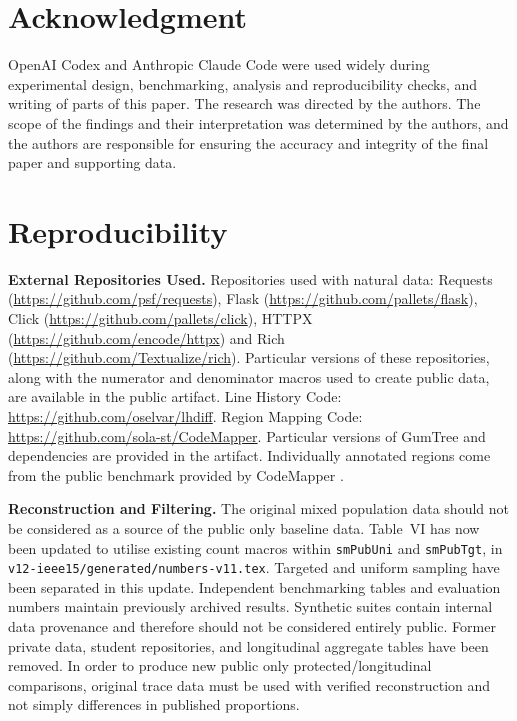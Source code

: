 \documentclass[10pt,conference,letterpaper]{IEEEtran}
\begin{document}
\section*{Acknowledgment}
OpenAI Codex and Anthropic Claude Code were used widely during experimental design, benchmarking, analysis and reproducibility checks, and writing of parts of this paper. The research was directed by the authors. The scope of the findings and their interpretation was determined by the authors, and the authors are responsible for ensuring the accuracy and integrity of the final paper and supporting data.

\section*{Reproducibility}
\textbf{External Repositories Used.} Repositories used with natural data: Requests (\url{https://github.com/psf/requests}), Flask (\url{https://github.com/pallets/flask}), Click (\url{https://github.com/pallets/click}), HTTPX (\url{https://github.com/encode/httpx}) and Rich (\url{https://github.com/Textualize/rich}). Particular versions of these repositories, along with the numerator and denominator macros used to create public data, are available in the public artifact. Line History Code: \url{https://github.com/oselvar/lhdiff}. Region Mapping Code: \url{https://github.com/sola-st/CodeMapper}. Particular versions of GumTree and dependencies are provided in the artifact. Individually annotated regions come from the public benchmark provided by CodeMapper \cite{codemapper2026}.

\textbf{Reconstruction and Filtering.} The original mixed population data should not be considered as a source of the public only baseline data. Table~VI has now been updated to utilise existing count macros within \texttt{smPubUni} and \texttt{smPubTgt}, in \texttt{v12-ieee15/generated/numbers-v11.tex}. Targeted and uniform sampling have been separated in this update. Independent benchmarking tables and evaluation numbers maintain previously archived results. Synthetic suites contain internal data provenance and therefore should not be considered entirely public. Former private data, student repositories, and longitudinal aggregate tables have been removed. In order to produce new public only protected/longitudinal comparisons, original trace data must be used with verified reconstruction and not simply differences in published proportions.
\end{document}
